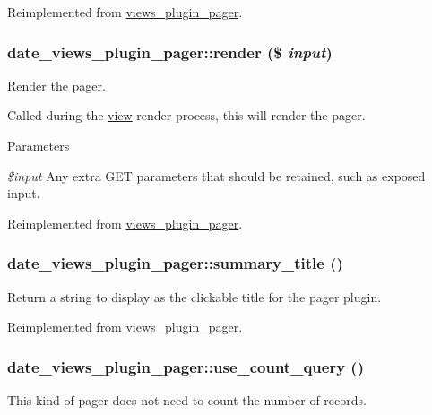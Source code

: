 Reimplemented from \hyperlink{classviews__plugin__pager_a6b9aad7e28125013cbf7a15c19e78d47}{views\_\-plugin\_\-pager}.\hypertarget{classdate__views__plugin__pager_a607a0d8a316a4b74f85205f35a59ce5a}{
\subsubsection[{render}]{\setlength{\rightskip}{0pt plus 5cm}date\_\-views\_\-plugin\_\-pager::render (\$ {\em input})}}
\label{classdate__views__plugin__pager_a607a0d8a316a4b74f85205f35a59ce5a}
Render the pager.

Called during the \hyperlink{classview}{view} render process, this will render the pager.


\begin{DoxyParams}{Parameters}
\item[{\em \$input}]Any extra GET parameters that should be retained, such as exposed input. \end{DoxyParams}


Reimplemented from \hyperlink{classviews__plugin__pager_abfc50728fdc63bfe94bcd242d39deb1e}{views\_\-plugin\_\-pager}.\hypertarget{classdate__views__plugin__pager_a8439f3b4b7c5bf990aff04627d3b38fa}{
\subsubsection[{summary\_\-title}]{\setlength{\rightskip}{0pt plus 5cm}date\_\-views\_\-plugin\_\-pager::summary\_\-title ()}}
\label{classdate__views__plugin__pager_a8439f3b4b7c5bf990aff04627d3b38fa}
Return a string to display as the clickable title for the pager plugin. 

Reimplemented from \hyperlink{classviews__plugin__pager_a12df2a012d53b9276a14fae94511f686}{views\_\-plugin\_\-pager}.\hypertarget{classdate__views__plugin__pager_ad8887dff6ec775d8333c040306e6524d}{
\subsubsection[{use\_\-count\_\-query}]{\setlength{\rightskip}{0pt plus 5cm}date\_\-views\_\-plugin\_\-pager::use\_\-count\_\-query ()}}
\label{classdate__views__plugin__pager_ad8887dff6ec775d8333c040306e6524d}
This kind of pager does not need to count the number of records. 

